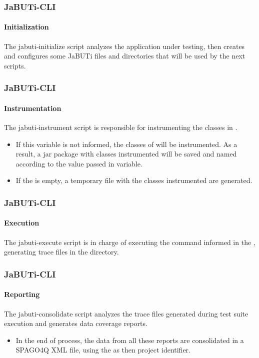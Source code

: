 \begin{frame}
\frametitle{JaBUTi-CLI}
\framesubtitle{Initialization}

\begin{cdt-concept}
The jabuti-initialize script analyzes the application under testing, then
creates and configures some JaBUTi files and directories that will be used by
the next scripts. 
\end{cdt-concept}

\end{frame}





\begin{frame}
\frametitle{JaBUTi-CLI}
\framesubtitle{Instrumentation}

\begin{cdt-concept}
The jabuti-instrument script is responsible for instrumenting the classes in
.
\end{cdt-concept}

\begin{cdt-facts}
\begin{itemize}
	\item If this variable is not informed, the classes of 
	will be instrumented. As a result, a jar package with classes instrumented
	will be saved and named according to the value passed in 
	variable.
	
	\item If the  is empty, a temporary file with the
	classes instrumented are generated.
\end{itemize}
\end{cdt-facts}
\end{frame}



\begin{frame}
\frametitle{JaBUTi-CLI}
\framesubtitle{Execution}

\begin{cdt-concept}
The jabuti-execute script is in charge of executing the command informed in the
, generating trace files in the
 directory.  
\end{cdt-concept}
\end{frame}


\begin{frame}
\frametitle{JaBUTi-CLI}
\framesubtitle{Reporting}

\begin{cdt-concept}
The jabuti-consolidate script analyzes the trace files generated during test
suite execution and generates data coverage reports.
\end{cdt-concept}

\begin{cdt-facts}
\begin{itemize}
	\item In the end of process, the data from all these reports are
	consolidated in a SPAGO4Q XML file, using the  as then
	project identifier. 
\end{itemize}
\end{cdt-facts}
\end{frame}
